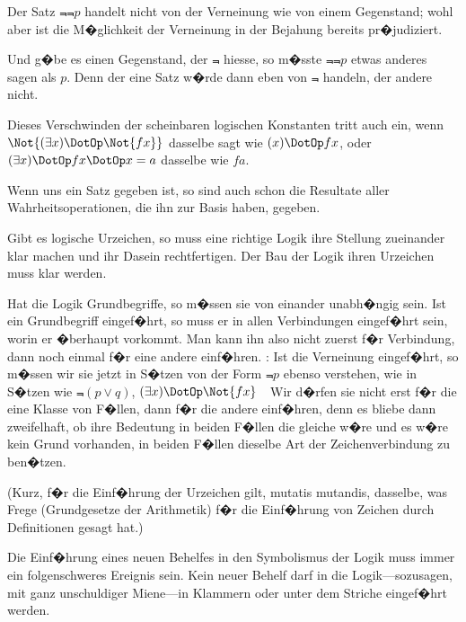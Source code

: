 \begin{propositions}
{Der Satz \glqq{}$\Not{\Not{p}}$\grqq{} handelt nicht von der Verneinung
wie von einem Gegenstand; wohl aber ist
die M�glichkeit der Verneinung in der Bejahung
bereits pr�judiziert.

Und g�be es einen Gegenstand, der \glqq{}$\Not{}$\grqq{} hiesse,
so m�sste \glqq{}$\Not{\Not{p}}$\grqq{} etwas anderes sagen als \glqq{}$p$\grqq{}.
Denn der eine Satz w�rde dann eben von $\Not{}$
handeln, der andere nicht.}


{Dieses Verschwinden der scheinbaren logischen
Konstanten tritt auch ein, wenn \glqq{}$\Not{(\exists x) \DotOp \Not{fx}}$\grqq{}
dasselbe sagt wie \glqq{}$(x) \DotOp fx$\grqq{}, oder \glqq{}$(\exists x) \DotOp fx \DotOp x = a$\grqq{}
dasselbe wie \glqq{}$fa$\grqq{}.}


{Wenn uns ein Satz gegeben ist, so sind  auch schon die Resultate aller Wahrheitsoperationen,
die ihn zur Basis haben, gegeben.}


{Gibt es logische Urzeichen, so muss eine richtige
Logik ihre Stellung zueinander klar machen und
ihr Dasein rechtfertigen. Der Bau der Logik 
ihren Urzeichen muss klar werden.}


{Hat die Logik Grundbegriffe, so m�ssen sie von
einander unabh�ngig sein. Ist ein Grundbegriff
eingef�hrt, so muss er in allen Verbindungen
eingef�hrt sein, worin er �berhaupt vorkommt. Man
kann ihn also nicht zuerst f�r  Verbindung,
dann noch einmal f�r eine andere einf�hren.
\ZumBeispiel: Ist die Verneinung eingef�hrt, so m�ssen
wir sie jetzt in S�tzen von der Form \glqq{}$\Not{p}$\grqq{} ebenso
verstehen, wie in S�tzen wie \glqq{}$\Not{(p \lor q)}$\grqq{}, \glqq{}$(\exists x) \DotOp \Not{fx}$\grqq{}~\undAndere\
Wir d�rfen sie nicht erst f�r die eine Klasse
von F�llen, dann f�r die andere einf�hren, denn es
bliebe dann zweifelhaft, ob ihre Bedeutung in beiden
F�llen die gleiche w�re und es w�re kein Grund
vorhanden, in beiden F�llen dieselbe Art der
Zeichenverbindung zu ben�tzen.

(Kurz, f�r die Einf�hrung der Urzeichen gilt,
mutatis mutandis, dasselbe, was Frege (\glqq{}Grundgesetze
der Arithmetik\grqq{}) f�r die Einf�hrung von
Zeichen durch Definitionen gesagt hat.)}


{Die Einf�hrung eines neuen Behelfes in den Symbolismus
der Logik muss immer ein folgenschweres
Ereignis sein. Kein neuer Behelf darf in die Logik---sozusagen,
mit ganz unschuldiger Miene---in Klammern
oder unter dem Striche eingef�hrt werden.

}
\end{propositions}
